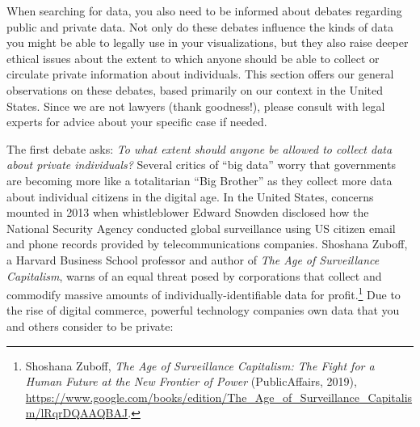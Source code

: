 \documentclass[
  english,
]{book}
\begin{document}
When searching for data, you also need to be informed about debates regarding public and private data. Not only do these debates influence the kinds of data you might be able to legally use in your visualizations, but they also raise deeper ethical issues about the extent to which anyone should be able to collect or circulate private information about individuals. This section offers our general observations on these debates, based primarily on our context in the United States. Since we are not lawyers (thank goodness!), please consult with legal experts for advice about your specific case if needed.

The first debate asks: \emph{To what extent should anyone be allowed to collect data about private individuals?} Several critics of ``big data'' worry that governments are becoming more like a totalitarian ``Big Brother'' as they collect more data about individual citizens in the digital age. In the United States, concerns mounted in 2013 when whistleblower Edward Snowden disclosed how the National Security Agency conducted global surveillance using US citizen email and phone records provided by telecommunications companies. Shoshana Zuboff, a Harvard Business School professor and author of \emph{The Age of Surveillance Capitalism}, warns of an equal threat posed by corporations that collect and commodify massive amounts of individually-identifiable data for profit.\footnote{Shoshana Zuboff, \emph{The {Age} of {Surveillance Capitalism}: {The Fight} for a {Human Future} at the {New Frontier} of {Power}} ({PublicAffairs}, 2019), \url{https://www.google.com/books/edition/The_Age_of_Surveillance_Capitalism/lRqrDQAAQBAJ}.} Due to the rise of digital commerce, powerful technology companies own data that you and others consider to be private:
\end{document}
